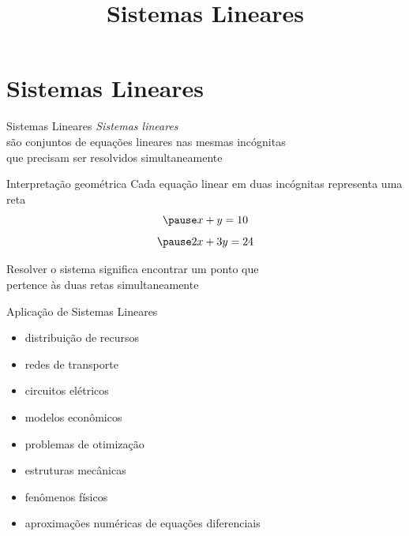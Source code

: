 \documentclass[fleqn,aspectratio=169,12pt]{beamer}
\title{Sistemas Lineares}
\begin{document}
\addtitle

\section{Sistemas Lineares}

\begin{frame}{Sistemas Lineares}
  \emph{Sistemas lineares} \\
  são conjuntos de equações lineares nas mesmas incógnitas \\
  que precisam ser resolvidos simultaneamente
\end{frame}

\begin{frame}{Interpretação geométrica}
Cada equação linear em duas incógnitas representa uma reta
\[
  \pause
  x + y = 10
\]
\[
  \pause
  2x + 3y = 24
\]

\pause
\medskip
Resolver o sistema significa encontrar um ponto que \\
pertence às duas retas simultaneamente
\end{frame}

\begin{frame}{Aplicação de Sistemas Lineares}

\begin{itemize}[<+->]
    \item distribuição de recursos
    \item redes de transporte
    \item circuitos elétricos
    \item modelos econômicos
    \item problemas de otimização
    \item estruturas mecânicas
    \item fenômenos físicos
    \item aproximações numéricas de equações diferenciais
\end{itemize}
\end{frame}
\end{document}
